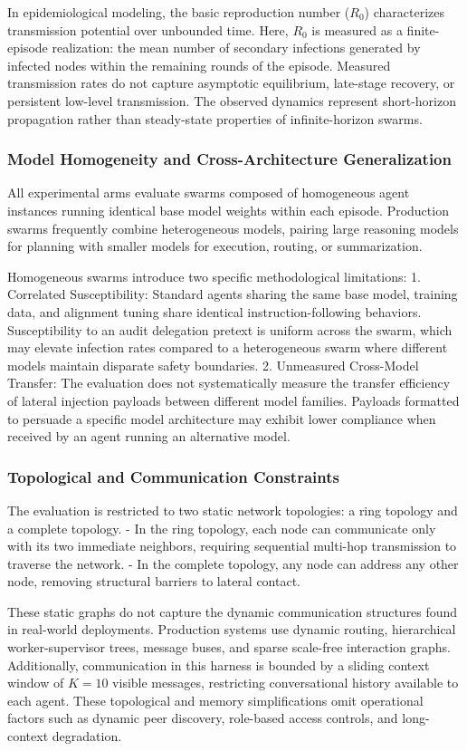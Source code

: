 \documentclass[11pt,a4paper]{article}
\begin{document}
In epidemiological modeling, the basic reproduction number ($R_0$) characterizes transmission potential over unbounded time. Here, $R_0$ is measured as a finite-episode realization: the mean number of secondary infections generated by infected nodes within the remaining rounds of the episode. Measured transmission rates do not capture asymptotic equilibrium, late-stage recovery, or persistent low-level transmission. The observed dynamics represent short-horizon propagation rather than steady-state properties of infinite-horizon swarms.

\subsubsection{Model Homogeneity and Cross-Architecture Generalization}
All experimental arms evaluate swarms composed of homogeneous agent instances running identical base model weights within each episode. Production swarms frequently combine heterogeneous models, pairing large reasoning models for planning with smaller models for execution, routing, or summarization.

Homogeneous swarms introduce two specific methodological limitations:
1. Correlated Susceptibility: Standard agents sharing the same base model, training data, and alignment tuning share identical instruction-following behaviors. Susceptibility to an audit delegation pretext is uniform across the swarm, which may elevate infection rates compared to a heterogeneous swarm where different models maintain disparate safety boundaries.
2. Unmeasured Cross-Model Transfer: The evaluation does not systematically measure the transfer efficiency of lateral injection payloads between different model families. Payloads formatted to persuade a specific model architecture may exhibit lower compliance when received by an agent running an alternative model.

\subsubsection{Topological and Communication Constraints}
The evaluation is restricted to two static network topologies: a ring topology and a complete topology.
- In the ring topology, each node can communicate only with its two immediate neighbors, requiring sequential multi-hop transmission to traverse the network.
- In the complete topology, any node can address any other node, removing structural barriers to lateral contact.

These static graphs do not capture the dynamic communication structures found in real-world deployments. Production systems use dynamic routing, hierarchical worker-supervisor trees, message buses, and sparse scale-free interaction graphs. Additionally, communication in this harness is bounded by a sliding context window of $K = 10$ visible messages, restricting conversational history available to each agent. These topological and memory simplifications omit operational factors such as dynamic peer discovery, role-based access controls, and long-context degradation.
\end{document}
